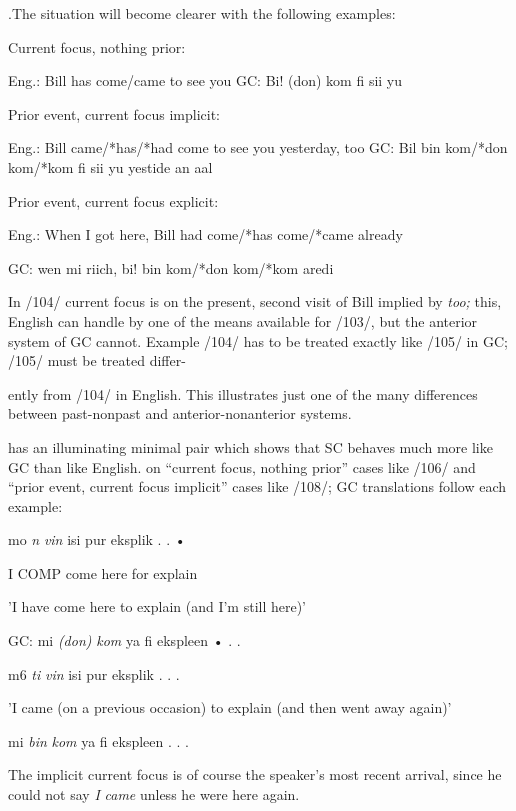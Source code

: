 .The situation will become clearer with the following examples:

\ea\label{ex:103}
 Current focus, nothing prior:
\glt
\z

Eng.: Bill has come/came to see you GC: Bi! (don) kom fi sii yu

\ea\label{ex:104}
 Prior event, current focus implicit:
\glt
\z

Eng.: Bill came/*has/*had come to see you yesterday, too GC: Bil bin kom/*don kom/*kom fi sii yu yestide an aal

\ea\label{ex:105}
 Prior event, current focus explicit:
\glt
\z

Eng.: When I got here, Bill had come/*has come/*came already

GC: wen mi riich, bi! bin kom/*don kom/*kom aredi

In /104/ current focus is on the present, second visit of Bill implied by \textit{too;} this, English can handle by one of the means available for /103/, but the anterior system of GC cannot. Example /104/ has to be treated exactly like /105/ in GC; /105/ must be treated differ-


ently from /104/ in English. This illustrates just one of the many differences between past-nonpast and anterior-nonanterior systems.

\citet[107]{Corne1977} has an illuminating minimal pair which shows that SC behaves much more like GC than like English. on ``current focus, nothing prior'' cases like /106/ and ``prior event, current focus implicit'' cases like /108/; GC translations follow each example:

\ea\label{ex:106}
 mo \textit{n} \textit{vin} isi pur eksplik . . •
\glt
\z

I COMP come here for explain

'I have come here to explain (and I'm still here)'

\ea\label{ex:107}
 GC: mi \textit{(don)} \textit{k}\textit{om} ya fi ekspleen • . .
\glt
\z

\ea\label{ex:108}
 m6 \textit{ti} \textit{vin} isi pur eksplik . . .
\glt
\z

'I came (on a previous occasion) to explain (and then went away again)'

\ea\label{ex:109}
 mi \textit{bin} \textit{kom} ya fi ekspleen . . .
\glt
\z

The implicit current focus is of course the speaker's most recent arrival, since he could not say \textit{I} \textit{came} unless he were here again.

